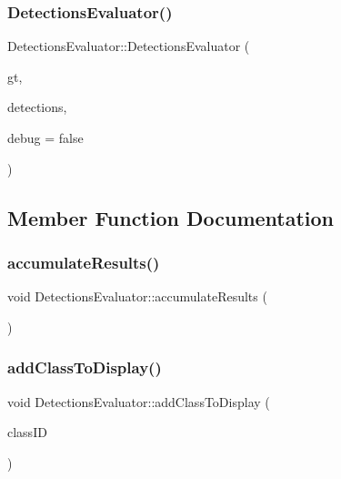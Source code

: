 \subsubsection{\texorpdfstring{Detections\+Evaluator()}{DetectionsEvaluator()}}
{\footnotesize\ttfamily Detections\+Evaluator\+::\+Detections\+Evaluator (\begin{DoxyParamCaption}\item[{\hyperlink{_dataset_reader_8h_a30d89cba514a220d64d04535c0465f1c}{Dataset\+Reader\+Ptr}}]{gt,  }\item[{\hyperlink{_dataset_reader_8h_a30d89cba514a220d64d04535c0465f1c}{Dataset\+Reader\+Ptr}}]{detections,  }\item[{bool}]{debug = {\ttfamily false} }\end{DoxyParamCaption})}



\subsection{Member Function Documentation}
\mbox{\label{class_detections_evaluator_ae5bd9702b49c12f39d09243b2d00ee74}} 
\subsubsection{\texorpdfstring{accumulate\+Results()}{accumulateResults()}}
{\footnotesize\ttfamily void Detections\+Evaluator\+::accumulate\+Results (\begin{DoxyParamCaption}{ }\end{DoxyParamCaption})}

\mbox{\label{class_detections_evaluator_a4dd79b8b2b45a8f035a2ce5d447d5738}} 
\subsubsection{\texorpdfstring{add\+Class\+To\+Display()}{addClassToDisplay()}}
{\footnotesize\ttfamily void Detections\+Evaluator\+::add\+Class\+To\+Display (\begin{DoxyParamCaption}\item[{const std\+::string \&}]{class\+ID }\end{DoxyParamCaption})}

